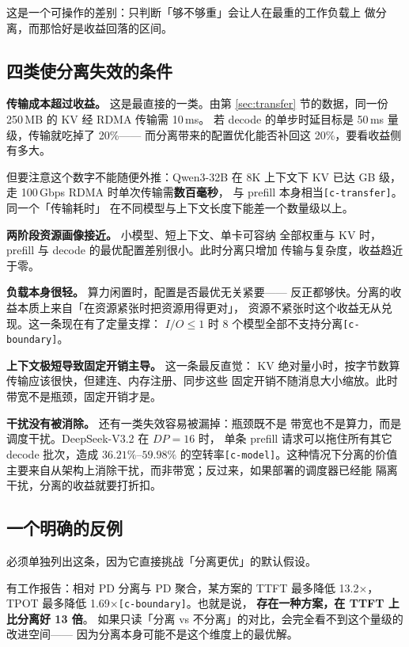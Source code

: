 这是一个可操作的差别：只判断「够不够重」会让人在最重的工作负载上
做分离，而那恰好是收益回落的区间。

\subsection{四类使分离失效的条件}

\noindent\textbf{ 传输成本超过收益。} 这是最直接的一类。由第
\ref{sec:transfer} 节的数据，同一份 250\,MB 的 KV 经 RDMA 传输需 10\,ms。
若 decode 的单步时延目标是 50\,ms 量级，传输就吃掉了 20\%——
而分离带来的配置优化能否补回这 20\%，要看收益侧有多大。

但要注意这个数字不能随便外推：Qwen3-32B 在 8K 上下文下 KV 已达
GB 级，走 100\,Gbps RDMA 时单次传输需\textbf{数百毫秒}，
与 prefill 本身相当\texttt{[c-transfer]}。同一个「传输耗时」
在不同模型与上下文长度下能差一个数量级以上。

\noindent\textbf{ 两阶段资源画像接近。} 小模型、短上下文、单卡可容纳
全部权重与 KV 时，prefill 与 decode 的最优配置差别很小。此时分离只增加
传输与复杂度，收益趋近于零。

\noindent\textbf{ 负载本身很轻。} 算力闲置时，配置是否最优无关紧要——
反正都够快。分离的收益本质上来自「在资源紧张时把资源用得更对」，
资源不紧张时这个收益无从兑现。这一条现在有了定量支撑：
$I/O \le 1$ 时 8 个模型全部不支持分离\texttt{[c-boundary]}。

\noindent\textbf{ 上下文极短导致固定开销主导。} 这一条最反直觉：
KV 绝对量小时，按字节数算传输应该很快，但建连、内存注册、同步这些
固定开销不随消息大小缩放。此时带宽不是瓶颈，固定开销才是。

\noindent\textbf{ 干扰没有被消除。} 还有一类失效容易被漏掉：瓶颈既不是
带宽也不是算力，而是调度干扰。DeepSeek-V3.2 在 $DP=16$ 时，
单条 prefill 请求可以拖住所有其它 decode 批次，造成
$36.21\%$--$59.98\%$ 的空转率\texttt{[c-model]}。这种情况下分离的价值
主要来自从架构上消除干扰，而非带宽；反过来，如果部署的调度器已经能
隔离干扰，分离的收益就要打折扣。

\subsection{一个明确的反例}

必须单独列出这条，因为它直接挑战「分离更优」的默认假设。

有工作报告：相对 PD 分离与 PD 聚合，某方案的 TTFT 最多降低 13.2×，
TPOT 最多降低 1.69×\texttt{[c-boundary]}。也就是说，
\textbf{存在一种方案，在 TTFT 上比分离好 13 倍}。
如果只读「分离 vs 不分离」的对比，会完全看不到这个量级的改进空间——
因为分离本身可能不是这个维度上的最优解。

